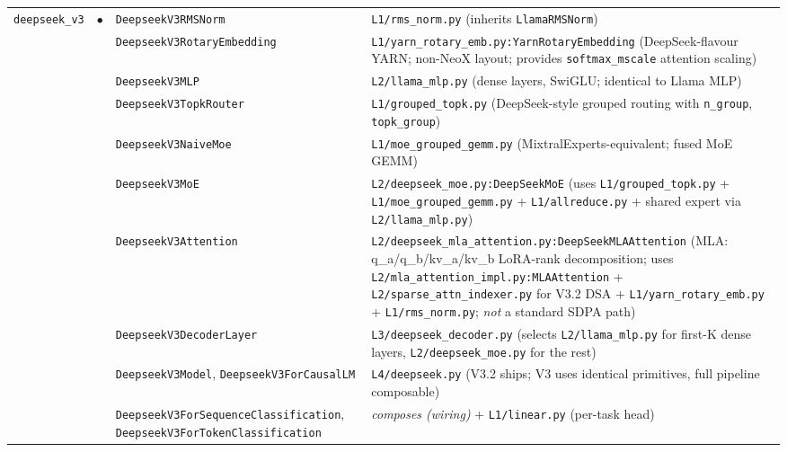 \documentclass[10pt]{article}
\begin{document}
{\begin{longtable}{@{}p{1.6cm} c p{4.0cm} p{14.5cm}@{}}
\multirow{10}{*}{\texttt{deepseek\_v3}} & \multirow{10}{*}{$\bullet$}
   & \texttt{DeepseekV3RMSNorm}       & \texttt{L1/rms\_norm.py} (inherits \texttt{LlamaRMSNorm}) \\
&& \texttt{DeepseekV3RotaryEmbedding} & \texttt{L1/yarn\_rotary\_emb.py:YarnRotaryEmbedding} (DeepSeek-flavour YARN; non-NeoX layout; provides \texttt{softmax\_mscale} attention scaling) \\
&& \texttt{DeepseekV3MLP}             & \texttt{L2/llama\_mlp.py} (dense layers, SwiGLU; identical to Llama MLP) \\
&& \texttt{DeepseekV3TopkRouter}      & \texttt{L1/grouped\_topk.py} (DeepSeek-style grouped routing with \texttt{n\_group}, \texttt{topk\_group}) \\
&& \texttt{DeepseekV3NaiveMoe}        & \texttt{L1/moe\_grouped\_gemm.py} (MixtralExperts-equivalent; fused MoE GEMM) \\
&& \texttt{DeepseekV3MoE}             & \texttt{L2/deepseek\_moe.py:DeepSeekMoE} (uses \texttt{L1/grouped\_topk.py} + \texttt{L1/moe\_grouped\_gemm.py} + \texttt{L1/allreduce.py} + shared expert via \texttt{L2/llama\_mlp.py}) \\
&& \texttt{DeepseekV3Attention}       & \texttt{L2/deepseek\_mla\_attention.py:DeepSeekMLAAttention} (MLA: q\_a/q\_b/kv\_a/kv\_b LoRA-rank decomposition; uses \texttt{L2/mla\_attention\_impl.py:MLAAttention} + \texttt{L2/sparse\_attn\_indexer.py} for V3.2 DSA + \texttt{L1/yarn\_rotary\_emb.py} + \texttt{L1/rms\_norm.py}; \emph{not} a standard SDPA path) \\
&& \texttt{DeepseekV3DecoderLayer}    & \texttt{L3/deepseek\_decoder.py} (selects \texttt{L2/llama\_mlp.py} for first-K dense layers, \texttt{L2/deepseek\_moe.py} for the rest) \\
&& \texttt{DeepseekV3Model}, \texttt{DeepseekV3ForCausalLM} & \texttt{L4/deepseek.py} (V3.2 ships; V3 uses identical primitives, full pipeline composable) \\
&& \texttt{DeepseekV3ForSequenceClassification}, \texttt{DeepseekV3ForTokenClassification} & \textit{composes (wiring)} + \texttt{L1/linear.py} (per-task head) \\
\midrule


\end{longtable}}
\end{document}
